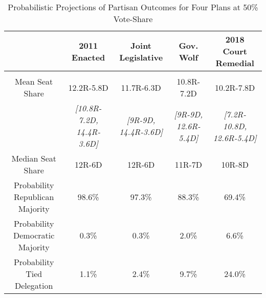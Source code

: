 \begin{landscape}
\begin{table}[!htbp] \centering 
  \caption{Probabilistic Projections of Partisan Outcomes for Four Plans at 50\% Vote-Share} 
  \label{tab:prob} 
\begin{tabular}{@{\extracolsep{-5pt}} ccccc} 
 & 2011 Enacted & Joint Legislative & Gov. Wolf & 2018 Court Remedial \\ 
\hline \\[-1.8ex] 
Mean Seat Share & 12.2R-5.8D & 11.7R-6.3D & 10.8R-7.2D & 10.2R-7.8D \\ 
 & {\small\textit{[10.8R-7.2D, 14.4R-3.6D]}} & {\small\textit{[9R-9D, 14.4R-3.6D]}} & {\small\textit{[9R-9D, 12.6R-5.4D]}} & {\small\textit{[7.2R-10.8D, 12.6R-5.4D]}} \\ 
Median Seat Share & 12R-6D & 12R-6D & 11R-7D & 10R-8D \\ 
Probability Republican Majority & 98.6\% & 97.3\% & 88.3\% & 69.4\% \\ 
Probability Democratic Majority & 0.3\% & 0.3\% & 2.0\% & 6.6\% \\ 
Probability Tied Delegation & 1.1\% & 2.4\% & 9.7\% & 24.0\% \\ 
\end{tabular}
\end{table}
\end{landscape}
